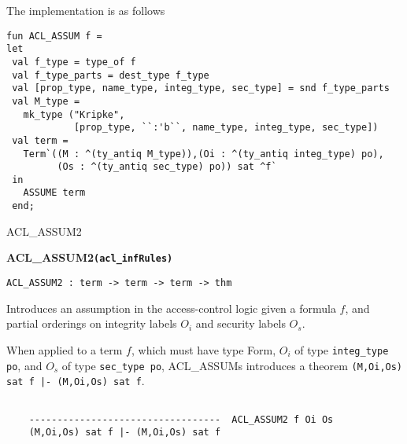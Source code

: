 \IMPLEMENTATION
The implementation is as follows
\begin{holboxed}
\begin{verbatim}
fun ACL_ASSUM f = 
let
 val f_type = type_of f
 val f_type_parts = dest_type f_type
 val [prop_type, name_type, integ_type, sec_type] = snd f_type_parts
 val M_type = 
   mk_type ("Kripke",
            [prop_type, ``:'b``, name_type, integ_type, sec_type])
 val term = 
   Term`((M : ^(ty_antiq M_type)),(Oi : ^(ty_antiq integ_type) po),
         (Os : ^(ty_antiq sec_type) po)) sat ^f`
 in
   ASSUME term
 end;
\end{verbatim}
\end{holboxed}

\SEEALSO
ACL\_ASSUM2
\ENDDOC

\begin{holboxed}
  \begin{Large}
    \textbf{ACL_ASSUM2}\hfill{}\texttt{\textbf{(acl\_infRules)}}
  \end{Large}
\end{holboxed}

\begin{verbatim}
ACL_ASSUM2 : term -> term -> term -> thm
\end{verbatim}

\SYNOPSIS
Introduces an assumption in the access-control logic
given a formula $f$, and partial orderings on integrity
labels $O_i$ and security labels $O_s$.

\DESCRIBE When applied to a term $f$, which must have type Form, $O_i$
of type \texttt{integ_type po}, and $O_s$ of type \texttt{sec_type
  po}, ACL_ASSUMs introduces a theorem \texttt{(M,Oi,Os) sat f |-
  (M,Oi,Os) sat f}.
\begin{verbatim}

    ----------------------------------  ACL_ASSUM2 f Oi Os
    (M,Oi,Os) sat f |- (M,Oi,Os) sat f
\end{verbatim}

